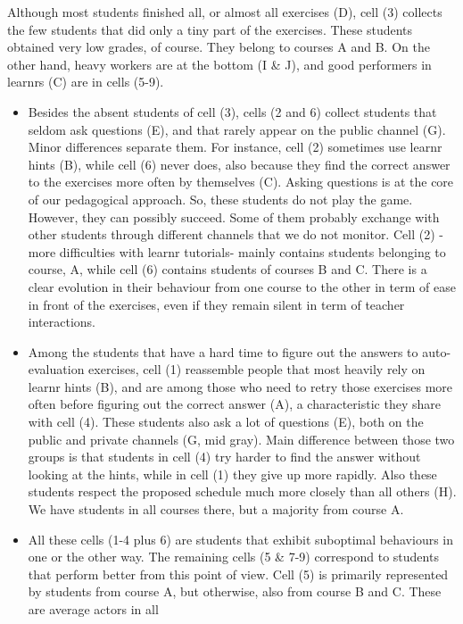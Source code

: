 \documentclass[
]{article}
\begin{document}
Although most students finished all, or almost all exercises (D), cell
(3) collects the few students that did only a tiny part of the
exercises. These students obtained very low grades, of course. They
belong to courses A and B. On the other hand, heavy workers are at the
bottom (I \& J), and good performers in learnrs (C) are in cells (5-9).

\begin{itemize}
\item
  Besides the absent students of cell (3), cells (2 and 6) collect
  students that seldom ask questions (E), and that rarely appear on the
  public channel (G). Minor differences separate them. For instance,
  cell (2) sometimes use learnr hints (B), while cell (6) never does,
  also because they find the correct answer to the exercises more often
  by themselves (C). Asking questions is at the core of our pedagogical
  approach. So, these students do not play the game. However, they can
  possibly succeed. Some of them probably exchange with other students
  through different channels that we do not monitor. Cell (2) -more
  difficulties with learnr tutorials- mainly contains students belonging
  to course, A, while cell (6) contains students of courses B and C.
  There is a clear evolution in their behaviour from one course to the
  other in term of ease in front of the exercises, even if they remain
  silent in term of teacher interactions.
\item
  Among the students that have a hard time to figure out the answers to
  auto-evaluation exercises, cell (1) reassemble people that most
  heavily rely on learnr hints (B), and are among those who need to
  retry those exercises more often before figuring out the correct
  answer (A), a characteristic they share with cell (4). These students
  also ask a lot of questions (E), both on the public and private
  channels (G, mid gray). Main difference between those two groups is
  that students in cell (4) try harder to find the answer without
  looking at the hints, while in cell (1) they give up more rapidly.
  Also these students respect the proposed schedule much more closely
  than all others (H). We have students in all courses there, but a
  majority from course A.
\item
  All these cells (1-4 plus 6) are students that exhibit suboptimal
  behaviours in one or the other way. The remaining cells (5 \& 7-9)
  correspond to students that perform better from this point of view.
  Cell (5) is primarily represented by students from course A, but
  otherwise, also from course B and C. These are average actors in all

\end{itemize}
\end{document}
